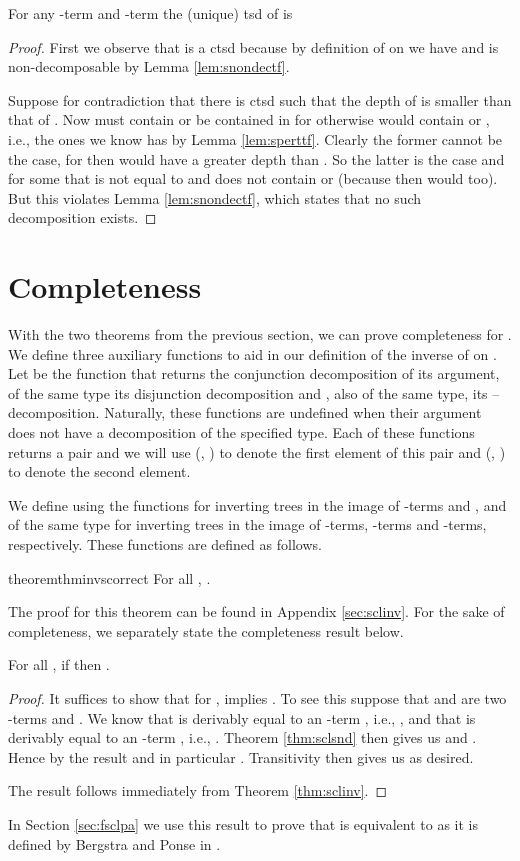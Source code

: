\begin{theorem}
\label{thm:stsd}
For any -term  and -term  the (unique) tsd of  is

\end{theorem}
\begin{proof}
First we observe that  is a ctsd because by
definition of  on  we have  and  is non-decomposable by Lemma \ref{lem:snondectf}.

Suppose for contradiction that there is ctsd  such that the depth of
 is smaller than that of . Now  must contain or be contained in
 for otherwise  would contain  or , i.e., the ones we
know  has by Lemma \ref{lem:sperttf}. Clearly the former cannot be the
case, for then  would have a greater depth than . So the latter is
the case and  for some  that is not equal
to  and does not contain  or  (because then  would
too). But this violates Lemma \ref{lem:snondectf}, which states that no such
decomposition exists.
\end{proof}

\section{Completeness}
\label{sec:sclcpl}
With the two theorems from the previous section, we can prove completeness for
. We define three auxiliary functions to aid in our definition of the
inverse of  on . Let  be the function
that returns the conjunction decomposition of its argument,  of the same
type its disjunction decomposition and , also of the same type, its
--decomposition. Naturally, these functions are undefined when their
argument does not have a decomposition of the specified type. Each of these
functions returns a pair and we will use  (, ) to denote
the first element of this pair and  (, ) to denote the
second element.

We define  using the functions  for
inverting trees in the image of -terms and , 
and  of the same type for inverting trees in the image of
-terms, -terms and -terms, respectively. These functions are
defined as follows.


\begin{restatable}{theorem}{thminvscorrect}
\label{thm:sclinv}
For all , .
\end{restatable}

The proof for this theorem can be found in Appendix \ref{sec:sclinv}. For the
sake of completeness, we separately state the completeness result below.

\begin{theorem}
\label{thm:sclcpl}
For all , if  then .
\end{theorem}
\begin{proof}
It suffices to show that for ,  implies . To see this suppose that  and  are two -terms and
. We know that  is derivably equal to an -term
, i.e., , and that  is derivably equal to an
-term , i.e., . Theorem \ref{thm:sclsnd} then
gives us  and . Hence by the result  and in particular . Transitivity then gives us
 as desired.

The result follows immediately from Theorem \ref{thm:sclinv}.
\end{proof}

In Section \ref{sec:fsclpa} we use this result to prove that  is
equivalent to  as it is defined by Bergstra and Ponse in \cite{scl}.
